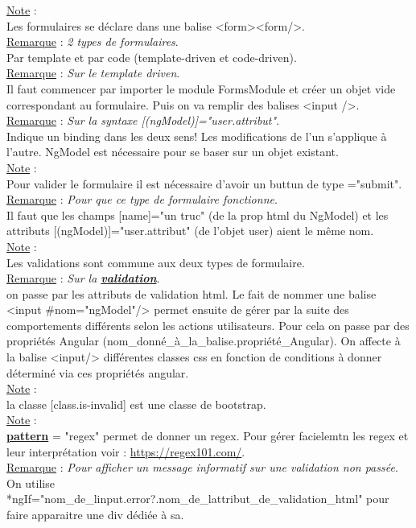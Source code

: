 \documentclass[a4paper,12pt,twoside]{article}
\newcommand{\urlcolor}{magenta}  %
\newcommand{\keycolor}{purple} %
\newcommand{\incode}[1]{{\footnotesize\ttfamily #1}} %
\newcommand{\rem}[2]{\noindent\underline{Remarque} : \textit{#1}.\\ \indent #2}
\newcommand{\note}[1]{\noindent\underline{Note} : \\ \indent #1}
\newcommand{\keyref}[2]{\hypersetup{urlcolor=\keycolor} \href{#1}{\textbf{#2}}\hypersetup{urlcolor=\urlcolor}}
\begin{document}
\note{Les formulaires se déclare dans une balise <form><form/>.}\\

\rem{2 types de formulaires}{Par template et par code (template-driven et code-driven).}\\

\rem{Sur le template driven}{Il faut commencer par importer le module \incode{FormsModule} et créer un objet vide correspondant au formulaire. Puis on va remplir des balises <input />.}\\

\rem{Sur la syntaxe [(ngModel)]="user.attribut"}{Indique un binding dans les deux sens! Les modifications de l'un s'applique à l'autre. NgModel est nécessaire pour se baser sur un objet existant.}\\

\note{Pour valider le formulaire il est nécessaire d'avoir un buttun de type ="submit".}\\

\rem{Pour que ce type de formulaire fonctionne}{Il faut que les champs [name]="un truc" (de la prop html du NgModel) et les attributs [(ngModel)]="user.attribut" (de l'objet user) aient le même nom.}\\

\note{Les validations sont commune aux deux types de formulaire.}\\

\rem{Sur la \keyref{https://developer.mozilla.org/fr/docs/Learn/Forms/Form_validation}{validation}}{on passe par les attributs de validation html. Le fait de nommer une balise <input \#nom="ngModel"/> permet ensuite de gérer par la suite des comportements différents selon les actions utilisateurs. Pour cela on passe par des propriétés Angular (nom\_donné\_à\_la\_balise.propriété\_Angular). On affecte à la balise <input/> différentes classes css en fonction de conditions à donner déterminé via ces propriétés angular.}\\
 
\note{la classe [class.is-invalid] est une classe de bootstrap.}\\

\note{\keyref{https://developer.mozilla.org/fr/docs/Web/HTML/Attributes/pattern}{pattern} = "regex" permet de donner un regex. Pour gérer facielemtn les regex et leur interprétation voir : \url{https://regex101.com/}.}\\

\rem{Pour afficher un message informatif sur une validation non passée}{On utilise *ngIf="nom\_de\_linput.error?.nom\_de\_lattribut\_de\_validation\_html" pour faire apparaitre une div dédiée à sa.}\\
\end{document}
